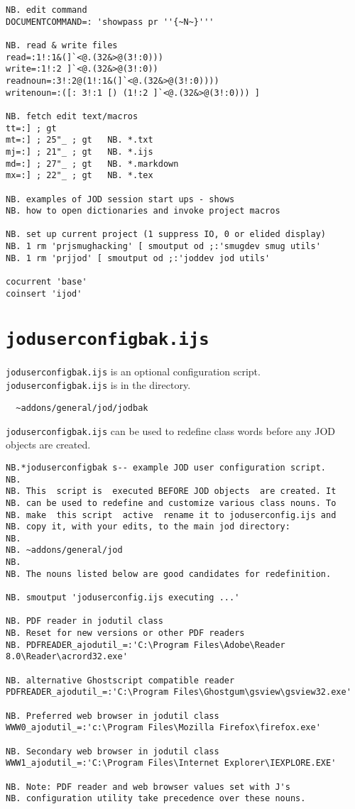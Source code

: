 \begin{lstlisting}[frame=single,framerule=0pt,basicstyle=\ttfamily\footnotesize]
NB. edit command 
DOCUMENTCOMMAND=: 'showpass pr ''{~N~}'''

NB. read & write files
read=:1!:1&(]`<@.(32&>@(3!:0)))
write=:1!:2 ]`<@.(32&>@(3!:0))
readnoun=:3!:2@(1!:1&(]`<@.(32&>@(3!:0))))
writenoun=:([: 3!:1 [) (1!:2 ]`<@.(32&>@(3!:0))) ]

NB. fetch edit text/macros
tt=:] ; gt
mt=:] ; 25"_ ; gt   NB. *.txt
mj=:] ; 21"_ ; gt   NB. *.ijs
md=:] ; 27"_ ; gt   NB. *.markdown
mx=:] ; 22"_ ; gt   NB. *.tex

NB. examples of JOD session start ups - shows
NB. how to open dictionaries and invoke project macros

NB. set up current project (1 suppress IO, 0 or elided display)
NB. 1 rm 'prjsmughacking' [ smoutput od ;:'smugdev smug utils'
NB. 1 rm 'prjjod' [ smoutput od ;:'joddev jod utils'

cocurrent 'base'
coinsert 'ijod'
\end{lstlisting}

   \newpage
   \section{\texttt{joduserconfigbak.ijs}}\label{ap:jodusercfgbak}
   
\verb|joduserconfigbak.ijs| is an optional configuration 
script. \verb|joduserconfigbak.ijs| is in the directory.
\begin{verbatim}
  ~addons/general/jod/jodbak
\end{verbatim}
\verb|joduserconfigbak.ijs| can be used to redefine class words before
any JOD objects are created. 
   
\begin{lstlisting}[frame=single,framerule=0pt,basicstyle=\ttfamily\footnotesize]  
NB.*joduserconfigbak s-- example JOD user configuration script.
NB.
NB. This  script is  executed BEFORE JOD objects  are created. It
NB. can be used to redefine and customize various class nouns. To
NB. make  this script  active  rename it to joduserconfig.ijs and
NB. copy it, with your edits, to the main jod directory:
NB.
NB. ~addons/general/jod
NB.
NB. The nouns listed below are good candidates for redefinition.

NB. smoutput 'joduserconfig.ijs executing ...'

NB. PDF reader in jodutil class
NB. Reset for new versions or other PDF readers
NB. PDFREADER_ajodutil_=:'C:\Program Files\Adobe\Reader 8.0\Reader\acrord32.exe'

NB. alternative Ghostscript compatible reader
PDFREADER_ajodutil_=:'C:\Program Files\Ghostgum\gsview\gsview32.exe'

NB. Preferred web browser in jodutil class
WWW0_ajodutil_=:'c:\Program Files\Mozilla Firefox\firefox.exe'

NB. Secondary web browser in jodutil class
WWW1_ajodutil_=:'C:\Program Files\Internet Explorer\IEXPLORE.EXE'

NB. Note: PDF reader and web browser values set with J's 
NB. configuration utility take precedence over these nouns. 
\end{lstlisting}


